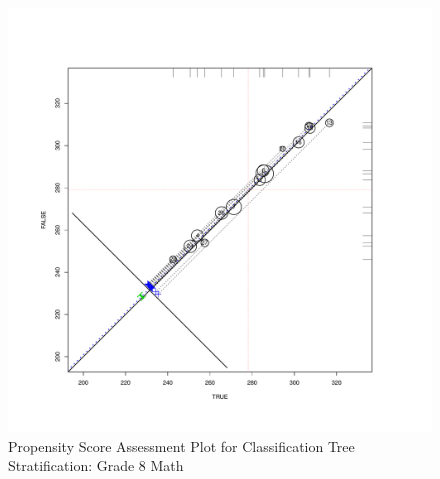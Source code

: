 \clearpage
\begin{figure}
\begin{center}
\includegraphics[height=.4\textheight,width=.4\textheight]{../Figures2009/g8math-circpsa-tree.pdf}
\caption{Propensity Score Assessment Plot for Classification Tree Stratification: Grade 8 Math}
\end{center}
\end{figure}



